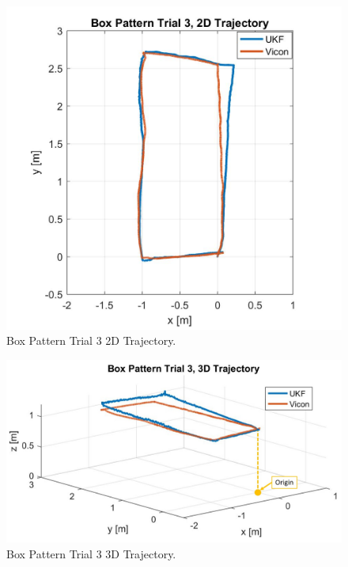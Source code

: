 \begin{figure}[p]
  \centering
    \includegraphics[height=0.4\textheight]{box3_2d}
  \caption[Box Pattern Trial 3 2D Trajectory]{Box Pattern Trial 3 2D Trajectory.}
  \label{fig:box3_2d}
\end{figure}
\begin{figure}[p]
  \centering
    \includegraphics[height=0.4\textheight]{box3_3d}
  \caption[Box Pattern Trial 3 3D Trajectory]{Box Pattern Trial 3 3D Trajectory.}
  \label{fig:box3_3d}
\end{figure}
\clearpage

